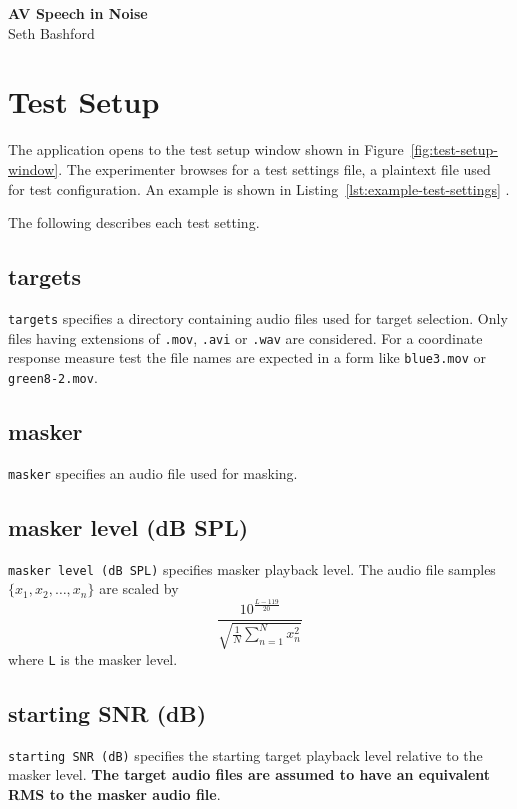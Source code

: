 \documentclass[11pt,pdftex,letterpaper]{article}
\begin{document}
\vspace*{30ex}
\begin{center}
\textbf{AV Speech in Noise}\\
\vspace{4ex}
Seth Bashford
\end{center}
\pagebreak
\tableofcontents
\pagebreak

\section{Test Setup}
The application opens to the test setup window shown in Figure~\ref{fig:test-setup-window}. The experimenter browses for a test settings file, a plaintext file used for test configuration. An example is shown in Listing~\ref{lst:example-test-settings} .

\noindent\begin{minipage}{\textwidth}
	
\end{minipage}
The following describes each test setting.
\subsection{targets}
\texttt{targets} specifies a directory containing audio files used for target selection. Only files having extensions of \texttt{.mov}, \texttt{.avi} or \texttt{.wav} are considered. For a coordinate response measure test the file names are expected in a form like \texttt{blue3.mov} or \texttt{green8-2.mov}.
\subsection{masker}
\texttt{masker} specifies an audio file used for masking.
\subsection{masker level (dB SPL)}
\texttt{masker level (dB SPL)} specifies masker playback level. The audio file samples ${\displaystyle \{x_{1}, x_{2}, \dots , x_{n}\}}$ are scaled by
\begin{equation}
 \frac{10^{\frac{L-119}{20}}}{\sqrt{\frac{1}{N}\sum_{n=1}^{N}x_{n}^{2}}}\label{eq:masker-scale}
\end{equation}
where \texttt{L} is the masker level.
\subsection{starting SNR (dB)}
\texttt{starting SNR (dB)} specifies the starting target playback level relative to the masker level. \textbf{The target audio files are assumed to have an equivalent RMS to the masker audio file}.
\end{document}

